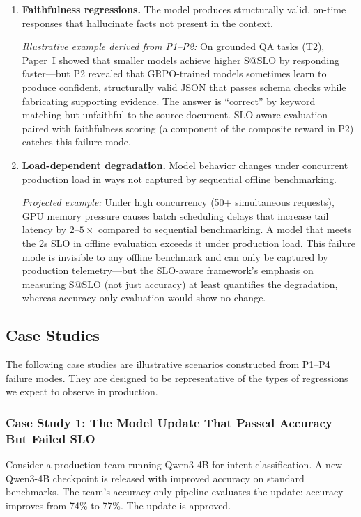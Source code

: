 \documentclass[11pt]{article}
\makeatletter
\newcommand{\sslo}{\ensuremath{\mathrm{S@SLO}}}
\makeatother
\begin{document}
\begin{enumerate}[leftmargin=16pt]
    \item \textbf{Faithfulness regressions.} The model produces structurally valid, on-time responses that hallucinate facts not present in the context.

    \textit{Illustrative example derived from P1--P2:} On grounded QA tasks (T2), Paper~I showed that smaller models achieve higher $\sslo{}$ by responding faster---but P2 revealed that GRPO-trained models sometimes learn to produce confident, structurally valid JSON that passes schema checks while fabricating supporting evidence. The answer is ``correct'' by keyword matching but unfaithful to the source document. SLO-aware evaluation paired with faithfulness scoring (a component of the composite reward in P2) catches this failure mode.

    \item \textbf{Load-dependent degradation.} Model behavior changes under concurrent production load in ways not captured by sequential offline benchmarking.

    \textit{Projected example:} Under high concurrency (50+ simultaneous requests), GPU memory pressure causes batch scheduling delays that increase tail latency by $2$--$5\times$ compared to sequential benchmarking. A model that meets the 2s SLO in offline evaluation exceeds it under production load. This failure mode is invisible to any offline benchmark and can only be captured by production telemetry---but the SLO-aware framework's emphasis on measuring $\sslo{}$ (not just accuracy) at least quantifies the degradation, whereas accuracy-only evaluation would show no change.
\end{enumerate}

\subsection{Case Studies}

The following case studies are illustrative scenarios constructed from P1--P4 failure modes. They are designed to be representative of the types of regressions we expect to observe in production.

\subsubsection{Case Study 1: The Model Update That Passed Accuracy But Failed SLO}

Consider a production team running Qwen3-4B for intent classification. A new Qwen3-4B checkpoint is released with improved accuracy on standard benchmarks. The team's accuracy-only pipeline evaluates the update: accuracy improves from 74\% to 77\%. The update is approved.
\end{document}
